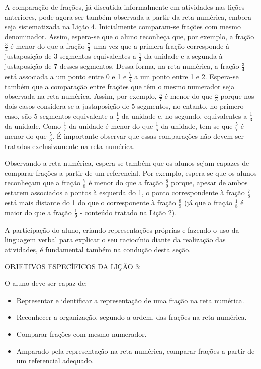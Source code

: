 A comparação de frações, já discutida informalmente em atividades nas lições anteriores, pode agora ser também observada a partir da reta numérica, embora seja sistematizada na Lição 4. Inicialmente comparam-se frações com mesmo denominador. Assim, espera-se que o aluno reconheça que, por exemplo, a fração $\frac{3}{4}$ é menor do que a fração $\frac{7}{4}$ uma vez que a primera fração corresponde à justaposição de 3 segmentos equivalentes a $\frac{1}{4}$ da unidade e a segunda à justaposição de 7 desses segmentos. Dessa forma, na reta numérica, a fração $\frac{3}{4}$ está associada a um ponto entre 0 e 1 e $\frac{7}{4}$ a um ponto entre 1 e 2. Espera-se também que a comparação entre frações que têm o mesmo numerador seja observada na reta numérica. Assim, por exemplo, $\frac{5}{7}$ é menor do que $\frac{5}{3}$ porque nos dois casos considera-se a justaposição de 5 segmentos, no entanto, no primero caso, são 5 segmentos equivalente a $\frac{1}{7}$ da unidade e, no segundo, equivalentes a $\frac{1}{3}$ da unidade. Como $\frac{1}{7}$ da unidade é menor do que $\frac{1}{5}$ da unidade, tem-se que $\frac{5}{7}$ é menor do que $\frac{5}{3}$.
É importante observar que essas comparações não devem ser tratadas exclusivamente na reta numérica. 

Observando a reta numérica, espera-se também que os alunos sejam capazes de comparar frações a partir de um referencial. Por exemplo, espera-se que os alunos reconheçam que a fração $\frac{7}{8}$ é menor do que a fração $\frac{8}{9}$ porque, apesar de ambos estarem associados a pontos à esquerda do 1, o ponto correspondente à fração $\frac{7}{8}$ está mais distante do 1 do que o corresponente à fração $\frac{8}{9}$ (já que a fração $\frac{1}{8}$ é maior do que a fração $\frac{1}{9}$ - conteúdo tratado na Lição 2). 

A participação do aluno, criando representações próprias e fazendo o uso da linguagem verbal para explicar o seu raciocínio diante da realização das atividades, é fundamental também na condução desta seção.
\vspace{.15cm}

\noindent OBJETIVOS ESPECÍFICOS DA LIÇÃO 3:
\vspace{.15cm}

\noindent O aluno deve ser capaz de:
  \begin{itemize}
   \item Representar e identificar a representação de uma fração na reta numérica.
   \item Reconhecer a organização, segundo a ordem, das frações na reta numérica. 
   \item Comparar frações com mesmo numerador.
   \item Amparado pela representação na reta numérica, comparar frações a partir de um referencial adequado.
  \end{itemize}
 


